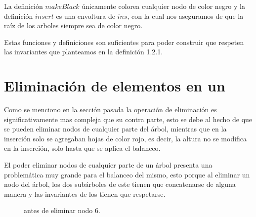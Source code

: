 La definici\'on $makeBlack$ únicamente colorea cualquier nodo de color negro y la definición
$insert$ es una envoltura de $ins$, con la cual nos aseguramos de que la ra\'iz de los arboles
siempre sea de color negro.

Estas funciones y definiciones son suficientes para poder construir {\arns} que respeten las
invariantes que planteamos en la definici\'on 1.2.1.

\section{Eliminación de elementos en un {\arn}}

Como se menciono en la secci\'on pasada la operaci\'on de eliminaci\'on es significativamente mas
compleja que su contra parte, esto se debe al hecho de que se pueden eliminar nodos de cualquier
parte del \'arbol, mientras que en la inserci\'on solo se agregaban hojas de color rojo, es decir,
la altura no se modifica en la inserción\cite{RBTypes}, solo hasta que se aplica el balanceo.

El poder eliminar nodos de cualquier parte de un \'arbol presenta una problemática muy grande para
el balanceo del mismo, esto porque al eliminar un nodo del \'arbol, los dos subárboles de este
tienen que concatenarse de alguna manera y las invariantes de los {\arns} tienen que respetarse.

\begin{figure}
\centering
\captionsetup{justification=centering}
\label{arbolRB_4}
\caption{{\Arn antes de eliminar nodo 6.}}
\end{figure}


